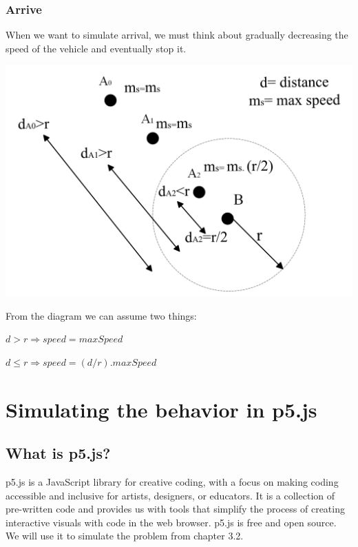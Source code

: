 \documentclass[10pt,twoside,slovak,a4paper]{article}
\begin{document}
\subsubsection{Arrive} \label{arrive}

When we want to simulate arrival, we must think about gradually decreasing the speed of the vehicle and eventually stop it.

\includegraphics[scale=0.25]{diagram_radius.png}

From the diagram we can assume two things: 

\begin{center}

$d>r 	\Rightarrow speed = maxSpeed$ \par

$d \leq r \Rightarrow speed = (d/r)  . maxSpeed$

\end{center}		


\section{Simulating the behavior in p5.js} \label{simulation} 

\subsection{What is p5.js?} \label{p5 char} 

p5.js is a JavaScript library for creative coding, with a focus on making coding accessible and inclusive for artists, designers, or educators. It is a collection of pre-written code and provides us with tools that simplify the process of creating interactive visuals with code in the web browser. p5.js is free and open source. We will use it to simulate the problem from chapter 3.2. 
\end{document}
